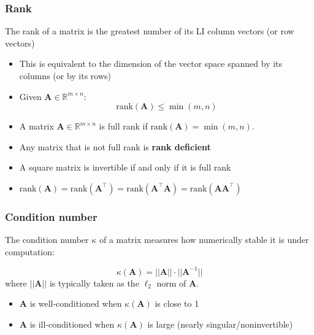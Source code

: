 \documentclass[smaller]{beamer}
\newcommand{\?}{\stackrel{?}{=}}
\newcommand{\mb}{\mathbb}
\newcommand{\tr}{^{\top}}
\begin{document}
\begin{frame}
  \frametitle{Rank}
  \pause The rank of a matrix is the greatest number of its LI column
  vectors (or row vectors) \pause
\begin{itemize}
\item This is equivalent to the dimension of the vector space spanned
  by its columns (or by its rows)
  \pause
\item Given $\bm A\in\mb{R}^{m\times n}$:
  \begin{equation}
    \text{rank}(\bm A) \le \min(m,n)
  \end{equation}
\pause
\item A matrix $\bm A\in\mb{R}^{m\times n}$ is full rank if
  $\text{rank}(\bm A) = \min(m,n)$.

\pause

\item Any matrix that is not full rank is \textbf{rank deficient}
\pause

\item A square matrix is invertible if and only if it is full rank
\pause

\item $\text{rank}(\bm A) = \text{rank}(\bm A\tr) = \text{rank}(\bm
  A\tr\bm A) = \text{rank}(\bm A\bm A\tr)$

\end{itemize}
\end{frame}

\begin{frame}
	\frametitle{Condition number}\pause
	The condition number $\kappa$ of a matrix measures how numerically stable it is under computation: \pause
	
	\begin{equation}
		\kappa (\bm A)  = ||\bm A|| \cdot ||\bm A^{-1}||
	\end{equation}
	\pause
	where $||\bm A||$ is typically taken as the $\ell_2$ norm of $\bm A$.
	\pause
	
	\begin{itemize}
		\item $\bm A$ is well-conditioned when $\kappa (\bm A)$ is close to 1
		\item $\bm A$ is ill-conditioned when $\kappa (\bm A)$ is large (nearly singular/noninvertible)
	\end{itemize}
\end{frame}
\end{document}
